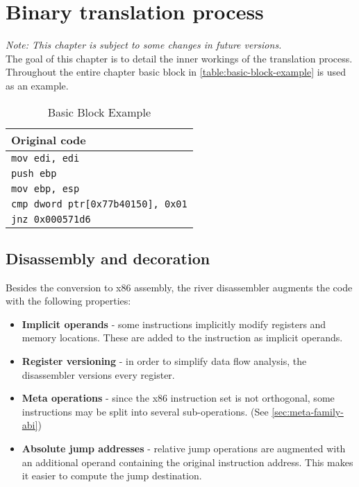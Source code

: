 \documentclass[12pt]{report}
\begin{document}
\chapter{Binary translation process}
\label{chapter:binary-translation-process}
\textit{Note: This chapter is subject to some changes in future versions.}\\
The goal of this chapter is to detail the inner workings of the translation process. Throughout the entire chapter basic block in \autoref{table:basic-block-example} is used as an example.\\
\begin{table}[H]
	\centering
	\begin{tabular}{| l |}
		\hline
		\textbf{Original code}\\ \hline
		\texttt{mov edi, edi}\\
		\texttt{push ebp}\\
		\texttt{mov ebp, esp}\\
		\texttt{cmp dword ptr[0x77b40150], 0x01}\\
		\texttt{jnz 0x000571d6}\\ \hline
	\end{tabular}
	\label{table:basic-block-example}
	\caption{Basic Block Example}
\end{table}

\section{Disassembly and decoration}
\label{sec:disassembly-and-decoration}
Besides the conversion to x86 assembly, the river disassembler augments the code with the following properties:
\begin{itemize}
	\item \textbf{Implicit operands} - some instructions implicitly modify registers and memory locations. These are added to the instruction as implicit operands.
	\item \textbf{Register versioning} - in order to simplify data flow analysis, the disassembler versions every register.
	\item \textbf{Meta operations} - since the x86 instruction set is not orthogonal, some instructions may be split into several sub-operations. (See \autoref{sec:meta-family-abi})
	\item \textbf{Absolute jump addresses} - relative jump operations are augmented with an additional operand containing the original instruction address. This makes it easier to compute the jump destination.
\end{itemize}
\end{document}
